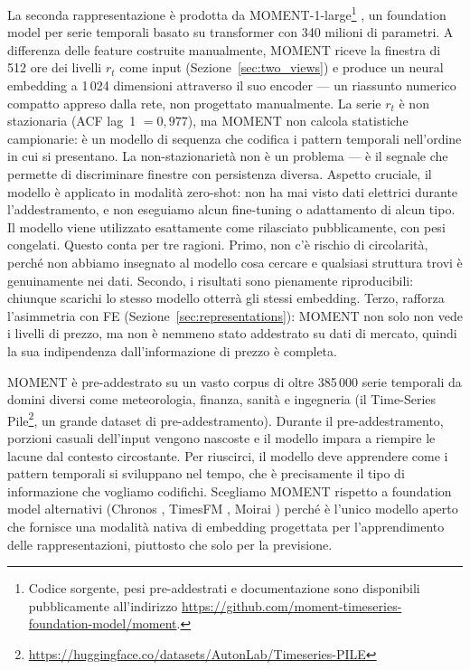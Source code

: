 \documentclass[12pt]{article}
\begin{document}
La seconda rappresentazione è prodotta da MOMENT-1-large\footnote{Codice sorgente, pesi pre-addestrati e documentazione sono disponibili pubblicamente all'indirizzo \url{https://github.com/moment-timeseries-foundation-model/moment}.} \citep{moment2024}, un foundation model per serie temporali basato su transformer con 340 milioni di parametri.
A differenza delle feature costruite manualmente, MOMENT riceve la finestra di 512 ore dei livelli $r_t$ come input (Sezione~\ref{sec:two_views}) e produce un neural embedding a 1\,024 dimensioni attraverso il suo encoder --- un riassunto numerico compatto appreso dalla rete, non progettato manualmente.
La serie $r_t$ è non stazionaria (ACF lag~1 $= 0{,}977$), ma MOMENT non calcola statistiche campionarie: è un modello di sequenza che codifica i pattern temporali nell'ordine in cui si presentano. La non-stazionarietà non è un problema --- è il segnale che permette di discriminare finestre con persistenza diversa.
Aspetto cruciale, il modello è applicato in modalità zero-shot: non ha mai visto dati elettrici durante l'addestramento, e non eseguiamo alcun fine-tuning o adattamento di alcun tipo.
Il modello viene utilizzato esattamente come rilasciato pubblicamente, con pesi congelati.
Questo conta per tre ragioni.
Primo, non c'è rischio di circolarità, perché non abbiamo insegnato al modello cosa cercare e qualsiasi struttura trovi è genuinamente nei dati.
Secondo, i risultati sono pienamente riproducibili: chiunque scarichi lo stesso modello otterrà gli stessi embedding.
Terzo, rafforza l'asimmetria con FE (Sezione~\ref{sec:representations}): MOMENT non solo non vede i livelli di prezzo, ma non è nemmeno stato addestrato su dati di mercato, quindi la sua indipendenza dall'informazione di prezzo è completa.

MOMENT è pre-addestrato su un vasto corpus di oltre 385\,000 serie temporali da domini diversi come meteorologia, finanza, sanità e ingegneria (il Time-Series Pile\footnote{\url{https://huggingface.co/datasets/AutonLab/Timeseries-PILE}}, un grande dataset di pre-addestramento).
Durante il pre-addestramento, porzioni casuali dell'input vengono nascoste e il modello impara a riempire le lacune dal contesto circostante.
Per riuscirci, il modello deve apprendere come i pattern temporali si sviluppano nel tempo, che è precisamente il tipo di informazione che vogliamo codifichi.
Scegliamo MOMENT rispetto a foundation model alternativi (Chronos \citep{chronos2024}, TimesFM \citep{timesfm2024}, Moirai \citep{woo2024}) perché è l'unico modello aperto che fornisce una modalità nativa di embedding progettata per l'apprendimento delle rappresentazioni, piuttosto che solo per la previsione.
\end{document}
